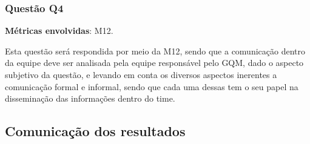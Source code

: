 	\subsubsection{Questão Q4}

		\textbf{Métricas envolvidas}: M12.
		
		Esta questão será respondida por meio da M12, sendo que a comunicação dentro da equipe deve ser analisada pela
		equipe responsável pelo GQM, dado o aspecto subjetivo da questão, e levando em conta os diversos aspectos 
		inerentes a comunicação formal e informal, sendo que cada uma dessas tem o seu papel na disseminação das 
		informações dentro do time.
      
      \subsection{Comunicação dos resultados}